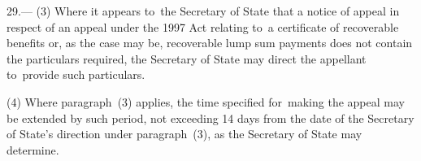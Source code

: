 \documentclass[12pt,a4paper]{article}
\begin{document}
29.—%
%
%
%
%
(3) Where it appears to~the Secretary of State that a notice of appeal in respect of an appeal under the 1997 Act relating to~a certificate of recoverable benefits or, as the case may be, recoverable lump sum payments does not contain the particulars required, the Secretary of State may direct the appellant to~provide such particulars.

(4) Where paragraph~(3) applies, the time specified for~making the appeal 
may be extended by such period, not exceeding 14 days from the date of the Secretary of State’s direction under paragraph~(3), as the Secretary of State may determine.
\end{document}
